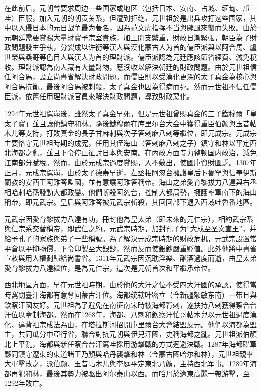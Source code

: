 在此前后，元朝曾要求周边一些国家或地区（包括日本、安南、占城、缅甸、爪哇）臣服，加入元朝的朝贡关系，但遭到拒绝，元世祖於是出兵攻打这些国家，其中以入侵日本的元日战争最为著名，因為范文虎指挥不当與颱風來襲而失敗。由於元朝廷需要賞賜大量財寶予宗室貴族，加上開支繁重，財政日漸緊張，朝臣為了財政問題發生爭執，分裂成以许衡等漢人與漢化蒙古人为首的儒臣派與以阿合馬、盧世榮與桑哥等色目人與漢人为首的理財派。儒臣派認為元廷應該節省經費、減免稅收。理財派認為南人藏有大量財物，應沒收以解決朝廷的財政問題。由於元世祖信任阿合馬，設立尚書省解決財政問題。而儒臣則以受漢化更深的太子真金為核心與阿合馬抗衡。最後阿合馬被刺殺，太子真金也因為得病而死。然而元世祖不信任儒臣派，依舊任用理財派官員來解決財政問題，導致財政惡化。

1294年元世祖駕崩後，雖然太子真金早死，但是元世祖曾賜真金的三子鐵穆爾「皇太子寶」並且讓他鎮守和林。隨後鐵穆爾在库里尔台大会中獲得重臣伯颜與玉昔帖木儿等支持，打敗真金的長子甘麻剌與次子答剌麻八剌等繼位，即元成宗。元成宗主要恪守元世祖時期的成宪，任用其侄海山（答剌麻八剌之子）鎮守和林以平定西北海都之亂，並且下令停止征討日本與安南。在內政方面专力整顿国内政治，減免江南部分賦稅。然而，由於元成宗過度賞賜，入不敷出，使國庫資財匱乏。1307年正月，元成宗駕崩，由於太子德寿早逝，左丞相阿忽台擁護皇后卜魯罕與信奉伊斯蘭教的安西王阿難答監國，並有意讓阿難答稱帝。海山之弟愛育黎拔力八達與右丞相哈剌哈孫發動大都政變。他們斬殺阿忽台，控制大都局勢，擁護率軍南下的海山稱帝，即元武宗。皇后與阿難答被元武宗斬殺，其回回部下退入西域吐魯番地區。

元武宗因愛育黎拔力八達有功，冊封他為皇太弟（即未來的元仁宗），相約武宗系與仁宗系交替稱帝，即武仁之約。元武宗時期，加封孔子为“大成至圣文宣王”，并給予孔子的家族與弟子一些稱號。為了解決元成宗時期的财政危机，元武宗設置常平倉以平抑物價，下令印製至大銀鈔，然而反而使銀鈔嚴重贬值。此外他將中書省宣敕與用人權劃歸給尚書省。1311年元武宗因沉耽淫樂、酗酒過度而逝，由皇太弟愛育黎拔力八達繼位，是為元仁宗，這次是元朝首次和平繼承帝位。

西北地區方面，早在元世祖時期，由於他的大汗之位不受四大汗國的承認，使得當時窩闊臺汗海都有意奪回蒙古汗位。海都统辖叶密立（今新疆额敏东南）一带且與欽察汗國友好。元世祖為了避免在南征南宋時被海都背刺，遂扶持八剌獲得察合台汗位以牽制海都。然而在1268年，海都、八剌和欽察汗忙哥帖木兒以元世祖過度漢化、違背祖宗成法為由，在塔拉斯河招開庫里爾台大會結盟反元。他們以海都為盟主，共同瓜分中亞行省，聯合對抗元朝與伊兒汗國，史稱海都之亂。元世祖派伯顏北上平亂，海都與新任察合台汗篤哇採用游擊戰的方式迴避決戰。1287年海都聯軍夥同鎮守遼東的東道諸王乃顏與哈丹襲擊和林（今蒙古國哈尔和林），元世祖親率大軍擊敗之，派伯颜、玉昔帖木儿與李庭平定東北乃顏，主持西北军事。1289年海都再犯和林，最後其勢力被驱出阿尔泰山以西。而哈丹於遼東高麗一帶游擊，至1292年敗亡。

